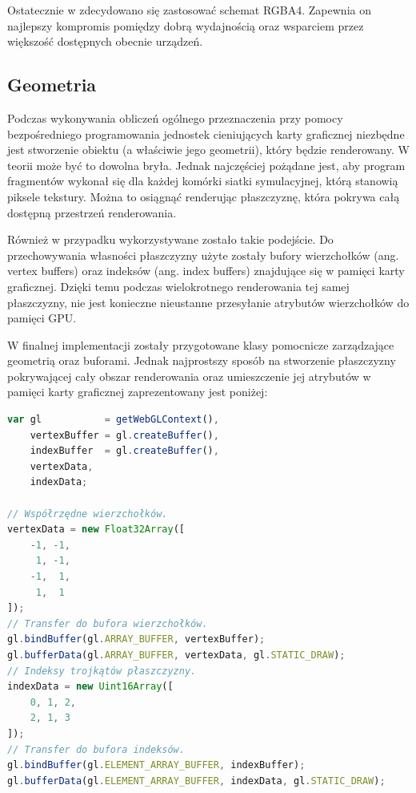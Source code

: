 Ostatecznie w  zdecydowano się zastosować schemat RGBA4. Zapewnia
on najlepszy kompromis pomiędzy dobrą wydajnością oraz wsparciem przez
większość dostępnych obecnie urządzeń.

\subsection{Geometria}

Podczas wykonywania obliczeń ogólnego przeznaczenia przy pomocy bezpośredniego
programowania jednostek cieniujących karty graficznej niezbędne jest
stworzenie obiektu (a właściwie jego geometrii), który będzie renderowany. W
teorii może być to dowolna bryła. Jednak najczęściej pożądane jest, aby
program fragmentów wykonał się dla każdej komórki siatki symulacyjnej, którą
stanowią piksele tekstury. Można to osiągnąć renderując płaszczyznę, która
pokrywa całą dostępną przestrzeń renderowania.

Również w przypadku \en wykorzystywane zostało takie podejście. Do
przechowywania własności płaszczyzny użyte zostały bufory wierzchołków
(ang. vertex buffers) oraz indeksów (ang. index buffers) znajdujące się w
pamięci karty graficznej. Dzięki temu podczas wielokrotnego renderowania tej
samej płaszczyzny, nie jest konieczne nieustanne przesyłanie atrybutów
wierzchołków do pamięci GPU.

W finalnej implementacji \en zostały przygotowane klasy pomocnicze
zarządzające geometrią oraz buforami. Jednak najprostszy sposób na stworzenie
płaszczyzny pokrywającej cały obszar renderowania oraz umieszczenie jej
atrybutów w pamięci karty graficznej zaprezentowany jest poniżej:

\begin{lstlisting}[language=JavaScript, caption=Definicja geometrii
płaszczyzny pokrywającej cały obszar renderowania]
var gl           = getWebGLContext(),
    vertexBuffer = gl.createBuffer(),
    indexBuffer  = gl.createBuffer(),
    vertexData,
    indexData;

// Współrzędne wierzchołków.
vertexData = new Float32Array([
    -1, -1, 
     1, -1,
    -1,  1,
     1,  1
]);
// Transfer do bufora wierzchołków.
gl.bindBuffer(gl.ARRAY_BUFFER, vertexBuffer);
gl.bufferData(gl.ARRAY_BUFFER, vertexData, gl.STATIC_DRAW);
// Indeksy trojkątów płaszczyzny.
indexData = new Uint16Array([
    0, 1, 2,
    2, 1, 3
]);
// Transfer do bufora indeksów.
gl.bindBuffer(gl.ELEMENT_ARRAY_BUFFER, indexBuffer);
gl.bufferData(gl.ELEMENT_ARRAY_BUFFER, indexData, gl.STATIC_DRAW);
\end{lstlisting}

